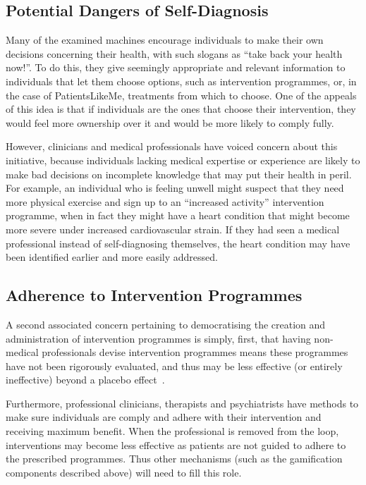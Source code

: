\documentclass{www13-companion-accepted}
\begin{document}
\subsection{Potential Dangers of Self-Diagnosis}

Many of the examined machines encourage individuals to make their own
decisions concerning their health, with such slogans as ``take back
your health now!''.  To do this, they give seemingly appropriate and
relevant information to individuals that let them choose options, such
as intervention programmes, or, in the case of PatientsLikeMe,
treatments from which to choose.  One of the appeals of this idea is
that if individuals are the ones that choose their intervention, they
would feel more ownership over it and would be more likely to comply
fully.

However, clinicians and medical professionals have voiced concern
about this initiative, because individuals lacking medical expertise or
experience are likely to make bad decisions on incomplete knowledge
that may put their health in peril.  For example, an individual who is
feeling unwell might suspect that they need more physical exercise and
sign up to an ``increased activity'' intervention programme, when in
fact they might have a heart condition that might become more severe
under increased cardiovascular strain.  If they had seen a medical
professional instead of self-diagnosing themselves, the heart
condition may have been identified earlier and more easily addressed.

\subsection{Adherence to Intervention Programmes}

A second associated concern pertaining to democratising the creation
and administration of intervention programmes is simply, first, that
having non-medical professionals devise intervention programmes means
these programmes have not been rigorously evaluated, and thus may be
less effective (or entirely ineffective) beyond a placebo effect~\cite{placeboeffect}.  

Furthermore, professional clinicians, therapists and psychiatrists
have methods to make sure individuals are comply and adhere with their
intervention and receiving maximum benefit.  When the professional is
removed from the loop, interventions may become less effective as
patients are not guided to adhere to the prescribed programmes. Thus
other mechanisms (such as the gamification components described above)
will need to fill this role.
\end{document}
